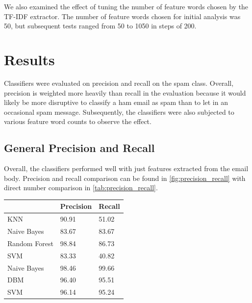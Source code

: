 \documentclass[12pt]{article}
\newenvironment{Figure}
  {\par\medskip\noindent\minipage{\linewidth}}
  {\endminipage\par\medskip}
\begin{document}
\begin{multicols}{2}
            We also examined the effect of tuning the number of feature words chosen by the TF-IDF 
            extractor. The number of feature words chosen for initial analysis was 50, but subsequent 
            tests ranged from 50 to 1050 in steps of 200.
        \section{Results}
            Classifiers were evaluated on precision and recall on the spam class. Overall, precision is
            weighted more heavily than recall in the evaluation because it would likely be more disruptive 
            to classify a ham email as spam than to let in an occasional spam message. Subsequently, the 
            classifiers were also subjected to various feature word counts to observe the effect.
            \subsection{General Precision and Recall}
                Overall, the classifiers performed well with just features extracted from the email body.
                Precision and recall comparison can be found in \autoref{fig:precision_recall} with direct 
                number comparison in \autoref{tab:precision_recall}. 

                \begin{Figure}
                    \begin{tabular}{|l|l|l|}
                        \hline
                        & Precision & Recall \\ \hline
                        KNN                                 & 90.91     & 51.02  \\ \hline
                        Naive Bayes                         & 83.67     & 83.67  \\ \hline
                        Random Forest                       & 98.84     & 86.73  \\ \hline
                        SVM                                 & 83.33     & 40.82  \\ \hline
                        Naive Bayes \cite{hovold2005naive}  & 98.46     & 99.66  \\ \hline
                        DBM \cite{tzortzis2007deep}         & 96.40     & 95.51  \\ \hline
                        SVM \cite{tzortzis2007deep}         & 96.14     & 95.24  \\ \hline
                    \end{tabular}
                    \label{tab:precision_recall}
                \end{Figure}


\end{multicols}
\end{document}
